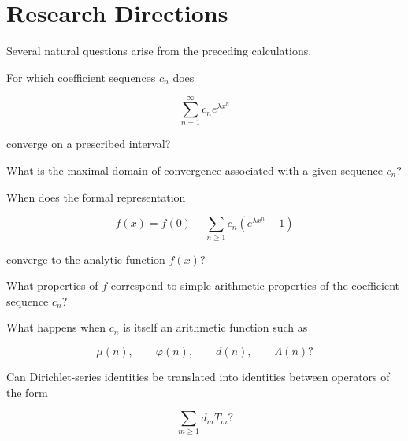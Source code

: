 
\chapter{Research Directions}


Several natural questions arise from the preceding calculations.

\begin{question}

For which coefficient sequences \(c_n\) does

\[
\sum_{n=1}^{\infty}c_ne^{\lambda x^n}
\]

converge on a prescribed interval?

\end{question}

\begin{question}

What is the maximal domain of convergence associated with a given
sequence \(c_n\)?

\end{question}

\begin{question}

When does the formal representation

\[
f(x)
=
f(0)
+
\sum_{n\geq1}
c_n
\left(
e^{\lambda x^n}-1
\right)
\]

converge to the analytic function \(f(x)\)?

\end{question}

\begin{question}

What properties of \(f\) correspond to simple arithmetic properties
of the coefficient sequence \(c_n\)?

\end{question}

\begin{question}

What happens when \(c_n\) is itself an arithmetic function such as

\[
\mu(n),
\qquad
\varphi(n),
\qquad
d(n),
\qquad
\Lambda(n)?
\]

\end{question}

\begin{question}

Can Dirichlet-series identities be translated into identities between
operators of the form

\[
\sum_{m\geq1}d_mT_m?
\]

\end{question}

